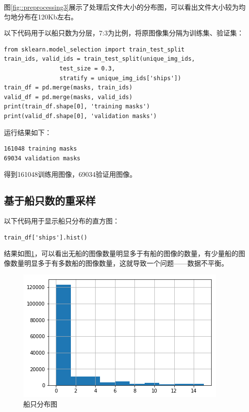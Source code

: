 图\ref{fig::preprocessing3}展示了处理后文件大小的分布图，可以看出文件大小较为均匀地分布在120Kb左右。

以下代码用于以船只数为分层，7:3为比例，将原图像集分隔为训练集、验证集：

\begin{lstlisting}
from sklearn.model_selection import train_test_split
train_ids, valid_ids = train_test_split(unique_img_ids, 
                test_size = 0.3, 
                stratify = unique_img_ids['ships'])
train_df = pd.merge(masks, train_ids)
valid_df = pd.merge(masks, valid_ids)
print(train_df.shape[0], 'training masks')
print(valid_df.shape[0], 'validation masks')
\end{lstlisting}

运行结果如下：

\begin{lstlisting}
161048 training masks
69034 validation masks
\end{lstlisting}

得到161048训练用图像，69034验证用图像。

\subsection{基于船只数的重采样}

以下代码用于显示船只分布的直方图：

\begin{lstlisting}
train_df['ships'].hist()
\end{lstlisting}

结果如图\ref{fig::preprocessing4}，可以看出无船的图像数量明显多于有船的图像的数量，有少量船的图像数量明显多于有多数船的图像数量，这就导致一个问题------数据不平衡。

\begin{figure}[htbp]
\centering
\includegraphics[width=0.7\linewidth]{body/preprocessing_pic/4}
\caption{船只分布图}
\label{fig::preprocessing4}
\end{figure}

